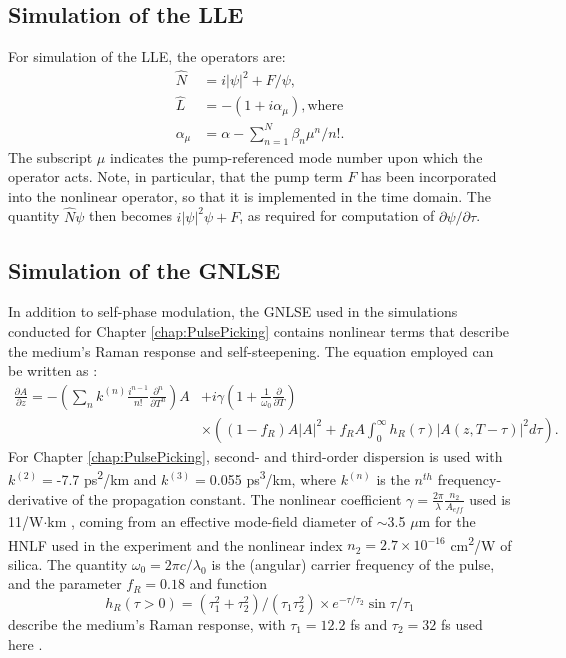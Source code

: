 \subsection{Simulation of the LLE}
For simulation of the LLE, the operators are: 
\begin{align}
\hat{N}&=i|\psi|^2+F/\psi,\\
\hat{L}&=-(1+i\alpha_\mu), \text{where}\\
\alpha_\mu&=\alpha-\sum_{n=1}^N\beta_n\mu^n/n!.
\end{align}
The subscript $\mu$ indicates the pump-referenced mode number upon which the operator acts. Note, in particular, that the pump term $F$ has been incorporated into the nonlinear operator, so that it is implemented in the time domain. The quantity $\hat{N}\psi$ then becomes $i|\psi|^2\psi+F$, as required for computation of $\partial\psi/\partial\tau$.

\subsection{Simulation of the GNLSE}

In addition to self-phase modulation, the GNLSE used in the simulations conducted for Chapter \ref{chap:PulsePicking} contains nonlinear terms that describe the medium's Raman response and self-steepening. The equation employed can be written as \cite{Hult2007,Agrawal2007}:
\begin{align}
\frac{\partial A}{\partial z}=-\left(\sum_n k^{(n)} \frac{i^{n-1}}{n!} \frac{\partial^n}{\partial T^n}\right)A&+i\gamma\left(1+\frac{1}{\omega_0}\frac{\partial}{\partial T}\right) \nonumber \\
&\times\left((1-f_R)A|A|^2+f_R A\int_0^\infty h_R(\tau)|A(z,T-\tau)|^2 d\tau\right).
\end{align}
For Chapter \ref{chap:PulsePicking}, second- and third-order dispersion is used with $k^{(2)}=$-7.7 ps\textsuperscript{2}/km and $k^{(3)}=$0.055 ps\textsuperscript{3}/km, where $k^{(n)}$ is the $n^{th}$ frequency-derivative of the propagation constant. The nonlinear coefficient $\gamma=\frac{2\pi}{\lambda}\frac{n_2}{A_{eff}}$ used is 11/W$\cdot$km \cite{Hirano2009}, coming from an effective mode-field diameter of $\sim$3.5 $\mu$m for the HNLF used in the experiment and the nonlinear index $n_2=2.7\times10^{-16}$ cm\textsuperscript{2}/W of silica. The quantity $\omega_0=2\pi c/\lambda_0$ is the (angular) carrier frequency of the pulse, and the parameter $f_R=0.18$ and function
\begin{equation}
h_R(\tau>0)=(\tau_1^2+\tau_2^2)/(\tau_1 \tau_2^2)\times e^{-\tau/\tau_2}\sin{\tau/\tau_1}
\end{equation} 
describe the medium's Raman response, with $\tau_1=12.2$ fs and $\tau_2=32$ fs used here \cite{Agrawal2007,Hult2007,Blow1989}.

